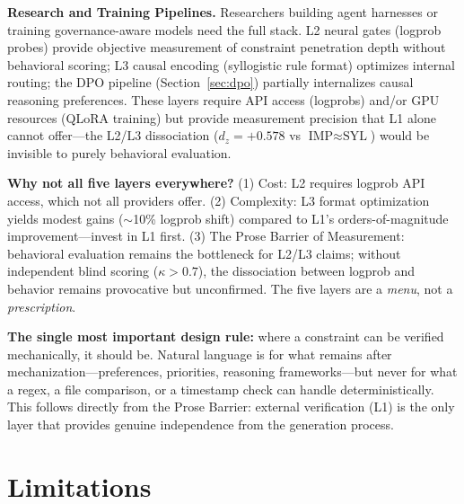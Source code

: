 \documentclass[11pt]{article}
\begin{document}
\textbf{Research and Training Pipelines.} Researchers building agent harnesses
or training governance-aware models need the full stack. L2 neural gates
(logprob probes) provide objective measurement of constraint penetration depth
without behavioral scoring; L3 causal encoding (syllogistic rule format)
optimizes internal routing; the DPO pipeline (Section~\ref{sec:dpo}) partially
internalizes causal reasoning preferences. These layers require API access
(logprobs) and/or GPU resources (QLoRA training) but provide measurement
precision that L1 alone cannot offer---the L2/L3 dissociation
($d_z{=}+0.578$ vs $\text{IMP}{\approx}\text{SYL}$) would be invisible to
purely behavioral evaluation.

\textbf{Why not all five layers everywhere?} (1) Cost: L2 requires logprob API
access, which not all providers offer. (2) Complexity: L3 format optimization
yields modest gains ($\sim$10\% logprob shift) compared to L1's orders-of-magnitude
improvement---invest in L1 first. (3) The Prose Barrier of Measurement: behavioral
evaluation remains the bottleneck for L2/L3 claims; without independent blind
scoring ($\kappa > 0.7$), the dissociation between logprob and behavior remains
provocative but unconfirmed. The five layers are a \textit{menu}, not a
\textit{prescription}.

\textbf{The single most important design rule:} where a constraint can be
verified mechanically, it should be. Natural language is for what remains after
mechanization---preferences, priorities, reasoning frameworks---but never for
what a regex, a file comparison, or a timestamp check can handle deterministically.
This follows directly from the Prose Barrier: external verification (L1) is the
only layer that provides genuine independence from the generation process.

\section{Limitations}
\label{sec:limitations}
\end{document}
